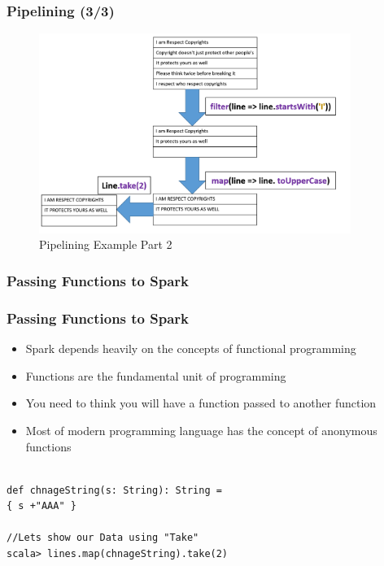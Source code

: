 \begin{frame}
	  \frametitle{Pipelining (3/3)}
	    \begin{figure}
	  	\caption{Pipelining Example Part 2}  		  				\includegraphics[width=\textwidth,height=6.5cm]{Graphics/take2pipe.PNG}
		\end{figure}
\end{frame}
%
%
%



\subsubsection{Passing Functions to Spark}
\begin{frame}[fragile]
	  \frametitle{Passing Functions to Spark}
\begin{itemize}[<+->]
\item Spark depends heavily on the concepts of functional programming
\item Functions are the fundamental unit of programming
\item You need to think you will have a function passed to another function
\item Most of modern programming language has the concept of anonymous functions
\end{itemize}
			\begin{lstlisting}[style=myScalastyle, caption=Passing Functions to RDD Example]

def chnageString(s: String): String =
{ s +"AAA" }				
				
//Lets show our Data using "Take"
scala> lines.map(chnageString).take(2)
			
			\end{lstlisting}
\end{frame}
%
%
%

